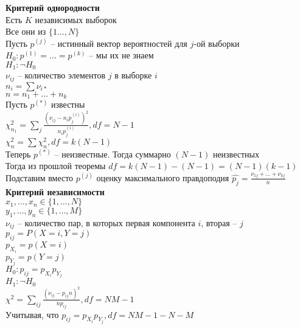 \documentclass[12pt]{article}
\begin{document}
\textbf{Критерий однородности}\\
Есть $K$ независимых выборок\\
Все они из $\{1\ldots,N\}$\\
Пусть $p^{(j)}$ -- истинный вектор вероятностей для $j$-ой выборки\\
$H_0: p^{(1)} = \ldots = p^{(k)}$ -- мы их не знаем\\
$H_1: \lnot H_0$\\
$\nu_{ij}$ -- количество элементов $j$ в выборке $i$\\
$n_i = \sum \nu_{i*}$\\
$n = n_1 + \ldots + n_k$\\
Пусть $p^{(*)}$ известны\\
$\chi_{n_1}^2 = \sum_j \frac{(\nu_{ij} - n_i p_j^{(i)})^2}{n_i p_j^{(i)}}, df = N - 1$\\
$\chi_n^2 = \sum \chi_n^2, df = k(N-1)$\\
Теперь $p^{(*)}$ -- неизвестные. Тогда суммарно $(N-1)$ неизвестных\\
Тогда из прошлой теоремы $df = k(N-1) - (N-1) = (N-1)(k-1)$\\
Подставим вместо $p^{(j)}$ оценку максимального правдоподия $\widehat{p_j} = \frac{\nu_{1j}+\ldots + \nu_{kj}}{n}$\\
\textbf{Критерий независимости}\\
$x_1, \ldots, x_n \in \{1,\ldots,N\}$\\
$y_1, \ldots, y_n \in \{1,\ldots,M\}$\\
$\nu_{ij}$ -- количество пар, в которых первая компонента $i$, вторая -- $j$\\
$p_{ij} = P(X=i, Y=j)$\\
$p_{X_i} = p(X=i)$\\
$p_{Y_j} = p(Y=j)$\\
$H_0: p_{ij} = p_{X_i}p_{Y_j}$\\
$H_1: \lnot H_0$\\
$\chi^2 = \sum_{ij} \frac{(\nu_{ij} - p_{ij}n)^2}{np_{ij}}, df = NM-1$\\
Учитывая, что $p_{ij} = p_{X_i}p_{Y_j}, df = NM-1-N-M$\\
\end{document}
